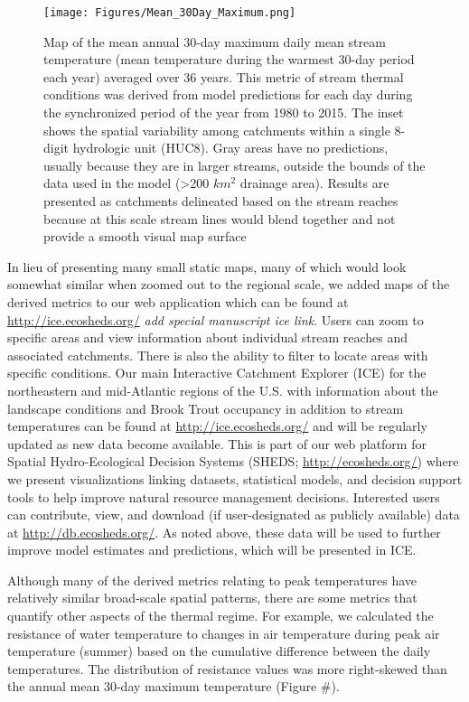 \documentclass[]{article}
\begin{document}
\begin{figure}[htbp]
\centering
\texttt{[image: Figures/Mean\_30Day\_Maximum.png]}
\caption{Map of the mean annual 30-day maximum daily mean stream
temperature (mean temperature during the warmest 30-day period each
year) averaged over 36 years. This metric of stream thermal conditions
was derived from model predictions for each day during the synchronized
period of the year from 1980 to 2015. The inset shows the spatial
variability among catchments within a single 8-digit hydrologic unit
(HUC8). Gray areas have no predictions, usually because they are in
larger streams, outside the bounds of the data used in the model
(\textgreater{}200 \(km^2\) drainage area). Results are presented as
catchments delineated based on the stream reaches because at this scale
stream lines would blend together and not provide a smooth visual map
surface}
\end{figure}

In lieu of presenting many small static maps, many of which would look
somewhat similar when zoomed out to the regional scale, we added maps of
the derived metrics to our web application which can be found at
\url{http://ice.ecosheds.org/} \emph{add special manuscript ice link}.
Users can zoom to specific areas and view information about individual
stream reaches and associated catchments. There is also the ability to
filter to locate areas with specific conditions. Our main Interactive
Catchment Explorer (ICE) for the northeastern and mid-Atlantic regions
of the U.S. with information about the landscape conditions and Brook
Trout occupancy in addition to stream temperatures can be found at
\url{http://ice.ecosheds.org/} and will be regularly updated as new data
become available. This is part of our web platform for Spatial
Hydro-Ecological Decision Systems (SHEDS; \url{http://ecosheds.org/})
where we present visualizations linking datasets, statistical models,
and decision support tools to help improve natural resource management
decisions. Interested users can contribute, view, and download (if
user-designated as publicly available) data at
\url{http://db.ecosheds.org/}. As noted above, these data will be used
to further improve model estimates and predictions, which will be
presented in ICE.

Although many of the derived metrics relating to peak temperatures have
relatively similar broad-scale spatial patterns, there are some metrics
that quantify other aspects of the thermal regime. For example, we
calculated the resistance of water temperature to changes in air
temperature during peak air temperature (summer) based on the cumulative
difference between the daily temperatures. The distribution of
resistance values was more right-skewed than the annual mean 30-day
maximum temperature (Figure \#).
\end{document}
